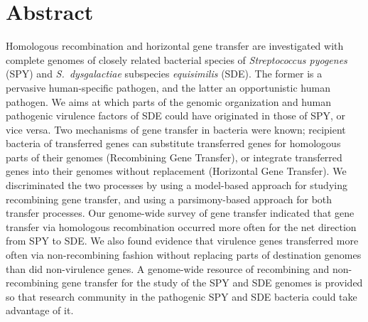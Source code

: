 \documentclass[10pt]{article}
\begin{document}
% 

\section*{Abstract}

Homologous recombination and horizontal gene transfer are investigated with
complete genomes of closely related bacterial species of \textit{Streptococcus
pyogenes} (SPY) and \textit{S.\ dysgalactiae} subspecies \textit{equisimilis}
(SDE).  The former is a pervasive human-specific pathogen, and the latter an
opportunistic human pathogen.  We aims at which parts of the genomic
organization and human pathogenic virulence factors of SDE could have originated
in those of SPY, or vice versa.  Two mechanisms of gene transfer in bacteria
were known; recipient bacteria of transferred genes can substitute transferred
genes for homologous parts of their genomes (Recombining Gene Transfer), or
integrate transferred genes into their genomes without replacement (Horizontal
Gene Transfer).  We discriminated the two processes by using a model-based
approach for studying recombining gene transfer, and using a parsimony-based
approach for both transfer processes.  Our genome-wide survey of gene transfer
indicated that gene transfer via homologous recombination occurred more often
for the net direction from SPY to SDE.  We also found evidence that virulence
genes transferred more often via non-recombining fashion without replacing parts
of destination genomes than did non-virulence genes.  
A genome-wide resource of
recombining and non-recombining gene transfer for the study of the SPY and SDE
genomes is provided so that research community in the pathogenic SPY and SDE
bacteria could take advantage of it. 
\end{document}
